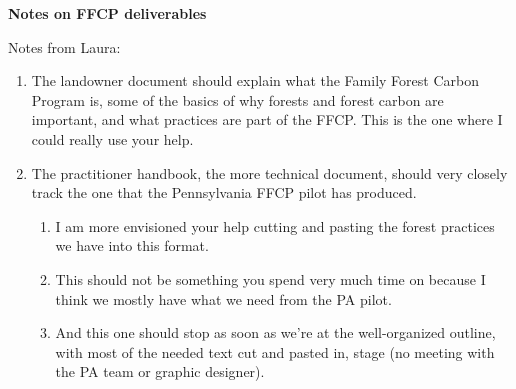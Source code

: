 \documentclass{article}\usepackage[]{graphicx}\usepackage[]{color}
\begin{document}
\noindent \textbf{\Large{Notes on FFCP deliverables}}


Notes from Laura:
\begin{enumerate}
\item The landowner document should explain what the Family Forest Carbon Program is, some of the basics of why forests and forest carbon are important, and what practices are part of the FFCP. This is the one where I could really use your help.
\item The practitioner handbook, the more technical document, should very closely track the one that the Pennsylvania FFCP pilot has produced.
  \begin{enumerate}
  \item I am more envisioned your help cutting and pasting the forest practices we have into this format. 
  \item This should not be something you spend very much time on because I think we mostly have what we need from the PA pilot. 
  \item And this one should stop as soon as we’re at the well-organized outline, with most of the needed text cut and pasted in, stage (no meeting with the PA team or graphic designer).
  \end{enumerate}
\end{enumerate}
\end{document}
